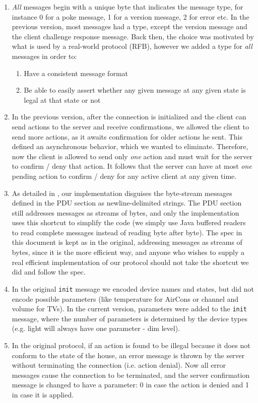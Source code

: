 \begin{enumerate}
\item {\em All} messages begin with a unique byte that indicates the message type, for instance 0 for a poke message, 1 for a version message, 2 for error etc. In the previous version, most messages had a type, except the version message and the client challenge response message. Back then, the choice was motivated by what is used by a real-world protocol (RFB), however we added a type for {\em all} messages in order to:
    \begin{enumerate}
        \item Have a consistent message format
        \item Be able to easily assert whether any given message at any given state is legal at that state or not
    \end{enumerate}
\item In the previous version, after the connection is initialized and the client can send actions to the server and receive confirmations, we allowed the client to send more actions, as it awaits confirmation for older actions he sent. This defined an asynchronous behavior, which we wanted to eliminate.
    Therefore, now the client is allowed to send only {\em one} action and must wait for the server to confirm / deny that action. It follows that the server can have at most {\em one} pending action to confirm / deny for any active client at any given time.
\item As detailed in , our implementation disguises the byte-stream messages defined in the PDU section as newline-delimited strings. The PDU section still addresses messages as streams of bytes, and only the implementation uses this shortcut to simplify the code (we simply use Java buffered readers to read complete messages instead of reading byte after byte). The spec in this document is kept as in the original, addressing messages as streams of bytes, since it is the more efficient way, and anyone who wishes to supply a real efficient implementation of our protocol should not take the shortcut we did and follow the spec.
\item In the original {\tt init} message we encoded device names and states, but did not encode possible parameters (like temperature for AirCons or channel and volume for TVs). In the current version, parameters were added to the {\tt init} message, where the number of parameters is determined by the device types (e.g. light will always have one parameter - dim level).
\item In the original protocol, if an action is found to be illegal because it does not conform to the state of the house, an error message is thrown by the server without terminating the connection (i.e. action denial). Now all error messages cause the connection to be terminated, and the server    confirmation message is changed to have a parameter: 0 in case the action is denied and 1 in case it is applied.
\end{enumerate}

